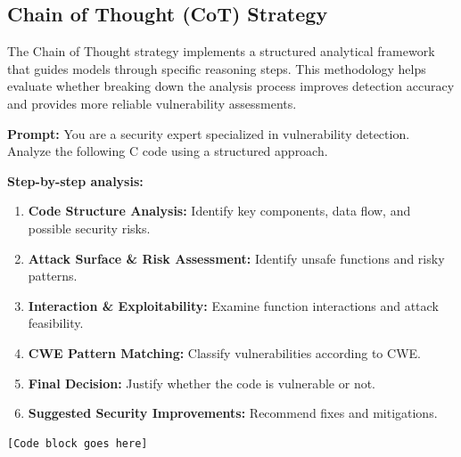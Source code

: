 \documentclass[sigconf,review,anonymous]{acmart}
\begin{document}
\subsection{Chain of Thought (CoT) Strategy}
The Chain of Thought strategy implements a structured analytical framework that guides models through specific reasoning steps. This methodology helps evaluate whether breaking down the analysis process improves detection accuracy and provides more reliable vulnerability assessments.
\begin{tcolorbox}[colback=redbox, colframe=red!60!black, 
title=\textbf{CoT Strategy}, 
sharp corners=south, boxrule=1pt, width=\linewidth]
\textbf{Prompt:}  
You are a security expert specialized in vulnerability detection. Analyze the following C code using a structured approach.

\textbf{Step-by-step analysis:}
\begin{enumerate}
    \item \textbf{Code Structure Analysis:} Identify key components, data flow, and possible security risks.
    \item \textbf{Attack Surface \& Risk Assessment:} Identify unsafe functions and risky patterns.
    \item \textbf{Interaction \& Exploitability:} Examine function interactions and attack feasibility.
    \item \textbf{CWE Pattern Matching:} Classify vulnerabilities according to CWE.
    \item \textbf{Final Decision:} Justify whether the code is vulnerable or not.
    \item \textbf{Suggested Security Improvements:} Recommend fixes and mitigations.
\end{enumerate}

\begin{verbatim}
[Code block goes here]
\end{verbatim}
\end{tcolorbox}

\end{document}
